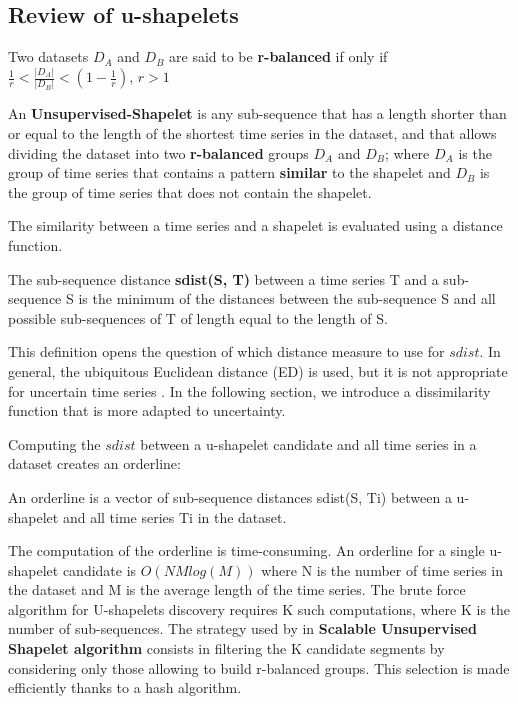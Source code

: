 \subsection{Review of u-shapelets}

\begin{definition}
Two datasets  $D_A$ and $D_B$ are said to be \textbf{r-balanced} if only if
$\frac{1}{r}<\frac{|D_{A}|}{|D_{B}|}<(1-\frac{1}{r}),\,r>1$
\end{definition}


\begin{definition}
An \textbf{Unsupervised-Shapelet} is any sub-sequence that has a length shorter than or equal to the length of the shortest time series in the dataset, and that allows dividing the dataset into two
\textbf{r-balanced} groups $D_A$ and $D_B$; where $D_A$ is the group of time series that contains a pattern \textbf{similar} to the shapelet and $D_B$ is the group of
time series that does not contain the shapelet.
\end{definition}

The similarity between a time series and a shapelet is evaluated using a distance function.


\begin{definition}
The sub-sequence distance \textbf{sdist(S, T)} between
a time series T and a sub-sequence S is the minimum of the
distances between the sub-sequence S and all possible
sub-sequences of T of length equal to the length of S.
\end{definition}
This definition opens the question of which distance measure to use for $sdist$.
In general, the ubiquitous Euclidean distance (ED) is used, but it is not
appropriate for uncertain time series \cite{Orang2014}. In the following section, we introduce a
dissimilarity function that is more adapted to  uncertainty.   


Computing the $sdist$ between a u-shapelet candidate
and all time series in a dataset creates an orderline:


\begin{definition}
An orderline is a vector of sub-sequence
distances sdist(S, Ti) between a u-shapelet and all time series Ti in the dataset.
\end{definition}

The computation of the orderline is time-consuming. An orderline for a single u-shapelet candidate is $O(NMlog(M))$ where N is the number of time series in the dataset and M is the average length of the time series. The brute force algorithm for U-shapelets discovery requires K such computations, where K is the number of sub-sequences. The strategy used by \cite{ulanova2015scalable} in \textbf{Scalable Unsupervised Shapelet algorithm} consists in filtering the K candidate segments  by considering only those allowing to build r-balanced groups.  This selection is made efficiently thanks to a hash algorithm.       



